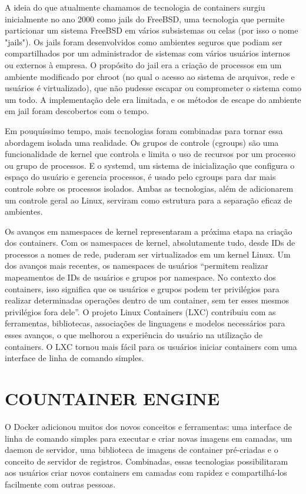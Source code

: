 A ideia do que atualmente chamamos de tecnologia de containers surgiu inicialmente no ano 2000 como jails do FreeBSD, uma tecnologia que permite particionar um sistema FreeBSD em vários subsistemas ou celas (por isso o nome "jails"). Os jails foram desenvolvidos como ambientes seguros que podiam ser compartilhados por um administrador de sistemas com vários usuários internos ou externos à empresa. O propósito do jail era a criação de processos em um ambiente modificado por chroot (no qual o acesso ao sistema de arquivos, rede e usuários é virtualizado), que não pudesse escapar ou comprometer o sistema como um todo. A implementação dele era limitada, e os métodos de escape do ambiente em jail foram descobertos com o tempo.

Em pouquíssimo tempo, mais tecnologias foram combinadas para tornar essa abordagem isolada uma realidade. Os grupos de controle (cgroups) são uma funcionalidade de kernel que controla e limita o uso de recursos por um processo ou grupo de processos. E o systemd, um sistema de inicialização que configura o espaço do usuário e gerencia processos, é usado pelo cgroups para dar mais controle sobre os processos isolados. Ambas as tecnologias, além de adicionarem um controle geral ao Linux, serviram como estrutura para a separação eficaz de ambientes.

Os avanços em namespaces de kernel representaram a próxima etapa na criação dos containers. Com os namespaces de kernel, absolutamente tudo, desde IDs de processos a nomes de rede, puderam ser virtualizados em um kernel Linux. Um dos avanços mais recentes, os namespaces de usuários “permitem realizar mapeamentos de IDs de usuários e grupos por namespace. No contexto dos containers, isso significa que os usuários e grupos podem ter privilégios para realizar determinadas operações dentro de um container, sem ter esses mesmos privilégios fora dele”. O projeto Linux Containers (LXC) contribuiu com as ferramentas, bibliotecas, associações de linguagens e modelos necessários para esses avanços, o que melhorou a experiência do usuário na utilização de containers. O LXC tornou mais fácil para os usuários iniciar containers com uma interface de linha de comando simples.

\section{COUNTAINER ENGINE}
\label{sec:countainerEngine}

O Docker adicionou muitos dos novos conceitos e ferramentas: uma interface de linha de comando simples para executar e criar novas imagens em camadas, um daemon de servidor, uma biblioteca de imagens de container pré-criadas e o conceito de servidor de registros. Combinadas, essas tecnologias possibilitaram aos usuários criar novos containers em camadas com rapidez e compartilhá-los facilmente com outras pessoas.

